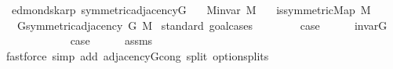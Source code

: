 \begin{isabellebody}
\isamarkupfalse%
%
\endisatagproof
{\isafoldproof}%
%
\isadelimproof
\isanewline
%
\endisadelimproof
%
\isadeliminvisible
\isanewline
%
\endisadeliminvisible
%
\isataginvisible
{}\isamarkupfalse%
\ {\isacharparenleft}{\kern0pt}\ edmonds{\isacharunderscore}{\kern0pt}karp{\isacharparenright}{\kern0pt}\ symmetric{\isacharunderscore}{\kern0pt}adjacency{\isacharunderscore}{\kern0pt}G{}{\isacharunderscore}{\kern0pt}{}{\isacharcolon}{\kern0pt}\isanewline
\ \ \ {\isachardoublequoteopen}M{\isachardot}{\kern0pt}invar\ M{\isachardoublequoteclose}\isanewline
\ \ \ {\isachardoublequoteopen}is{\isacharunderscore}{\kern0pt}symmetric{\isacharunderscore}{\kern0pt}Map\ M{\isachardoublequoteclose}\isanewline
\ \ \ {\isachardoublequoteopen}G{\isachardot}{\kern0pt}symmetric{\isacharunderscore}{\kern0pt}adjacency{\isacharprime}{\kern0pt}\ {\isacharparenleft}{\kern0pt}G{}{\isacharunderscore}{\kern0pt}{}\ M{\isacharparenright}{\kern0pt}{\isachardoublequoteclose}%
\endisataginvisible
{\isafoldinvisible}%
%
\isadeliminvisible
\isanewline
%
\endisadeliminvisible
%
\isadelimproof
%
\endisadelimproof
%
\isatagproof
{}\isamarkupfalse%
\ {\isacharparenleft}{\kern0pt}standard{\isacharcomma}{\kern0pt}\ goal{\isacharunderscore}{\kern0pt}cases{\isacharparenright}{\kern0pt}\isanewline
\ \ \isamarkupfalse%
\ {}\isanewline
\ \ \isamarkupfalse%
\ {\isacharquery}{\kern0pt}case\isanewline
\ \ \ \ \isamarkupfalse%
\ invar{\isacharunderscore}{\kern0pt}G{}{\isacharunderscore}{\kern0pt}{}\isanewline
\ \ \ \ \isacommand{{\isachardot}{\kern0pt}}\isamarkupfalse%
\isanewline
{}\isamarkupfalse%
\isanewline
\ \ \isamarkupfalse%
\ {}\isanewline
\ \ \isamarkupfalse%
\ {\isacharquery}{\kern0pt}case\isanewline
\ \ \ \ \isamarkupfalse%
\ assms\isanewline
\ \ \ \ \isamarkupfalse%
\ {\isacharparenleft}{\kern0pt}fastforce\ simp\ add{\isacharcolon}{\kern0pt}\ adjacency{\isacharunderscore}{\kern0pt}G{}{\isacharunderscore}{\kern0pt}{}{\isacharunderscore}{\kern0pt}cong\ split{\isacharcolon}{\kern0pt}\ option{\isachardot}{\kern0pt}splits{\isacharparenleft}{\kern0pt}{}{\isacharparenright}{\kern0pt}{\isacharparenright}{\kern0pt}\isanewline
{}\isamarkupfalse%
%
\endisatagproof
{\isafoldproof}%
%
\isadelimproof
\isanewline
%
\endisadelimproof

\end{isabellebody}
